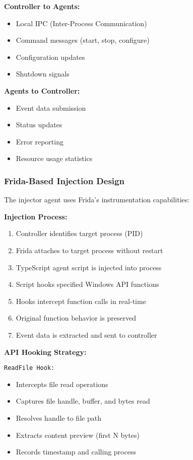 \textbf{Controller to Agents:}
\begin{itemize}
    \item Local IPC (Inter-Process Communication)
    \item Command messages (start, stop, configure)
    \item Configuration updates
    \item Shutdown signals
\end{itemize}

\textbf{Agents to Controller:}
\begin{itemize}
    \item Event data submission
    \item Status updates
    \item Error reporting
    \item Resource usage statistics
\end{itemize}

\subsubsection{Frida-Based Injection Design}

The injector agent uses Frida's instrumentation capabilities:

\textbf{Injection Process:}
\begin{enumerate}
    \item Controller identifies target process (PID)
    \item Frida attaches to target process without restart
    \item TypeScript agent script is injected into process
    \item Script hooks specified Windows API functions
    \item Hooks intercept function calls in real-time
    \item Original function behavior is preserved
    \item Event data is extracted and sent to controller
\end{enumerate}

\textbf{API Hooking Strategy:}

\texttt{ReadFile Hook:}
\begin{itemize}
    \item Intercepts file read operations
    \item Captures file handle, buffer, and bytes read
    \item Resolves handle to file path
    \item Extracts content preview (first N bytes)
    \item Records timestamp and calling process
\end{itemize}

